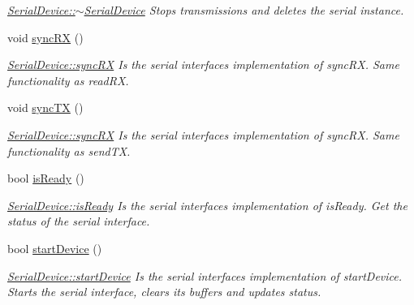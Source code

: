 \begin{DoxyCompactItemize}
\begin{DoxyCompactList}\small\item\em \hyperlink{class_serial_device_abd30865bc9e855e8be713f666d6b4244}{Serial\+Device\+::$\sim$\+Serial\+Device} Stops transmissions and deletes the serial instance. \end{DoxyCompactList}\item 
\hypertarget{class_serial_device_a79c9685f76771703557b2044e941f27a}{}\label{class_serial_device_a79c9685f76771703557b2044e941f27a} 
void \hyperlink{class_serial_device_a79c9685f76771703557b2044e941f27a}{sync\+RX} ()
\begin{DoxyCompactList}\small\item\em \hyperlink{class_serial_device_a79c9685f76771703557b2044e941f27a}{Serial\+Device\+::sync\+RX} Is the serial interface\textquotesingle{}s implementation of sync\+RX. Same functionality as read\+RX. \end{DoxyCompactList}\item 
\hypertarget{class_serial_device_a8e53f81ff51ef332a03c3276804a32c8}{}\label{class_serial_device_a8e53f81ff51ef332a03c3276804a32c8} 
void \hyperlink{class_serial_device_a8e53f81ff51ef332a03c3276804a32c8}{sync\+TX} ()
\begin{DoxyCompactList}\small\item\em \hyperlink{class_serial_device_a79c9685f76771703557b2044e941f27a}{Serial\+Device\+::sync\+RX} Is the serial interface\textquotesingle{}s implementation of sync\+RX. Same functionality as send\+TX. \end{DoxyCompactList}\item 
bool \hyperlink{class_serial_device_aa2435fb76a612b2ebf1a61287deee85d}{is\+Ready} ()
\begin{DoxyCompactList}\small\item\em \hyperlink{class_serial_device_aa2435fb76a612b2ebf1a61287deee85d}{Serial\+Device\+::is\+Ready} Is the serial interface\textquotesingle{}s implementation of is\+Ready. Get the status of the serial interface. \end{DoxyCompactList}\item 
bool \hyperlink{class_serial_device_a6940a33b7c8f4b83438d16cfa7d8d3ff}{start\+Device} ()
\begin{DoxyCompactList}\small\item\em \hyperlink{class_serial_device_a6940a33b7c8f4b83438d16cfa7d8d3ff}{Serial\+Device\+::start\+Device} Is the serial interface\textquotesingle{}s implementation of start\+Device. Starts the serial interface, clears its buffers and updates status. \end{DoxyCompactList}\item 

\end{DoxyCompactItemize}
